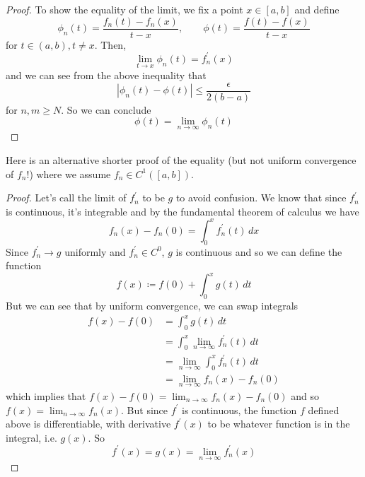 \begin{proof}
    To show the equality of the limit, we fix a point $x \in [a, b]$ and define 
    \begin{equation}
      \phi_n (t) = \frac{f_n (t) - f_n (x)}{t - x}, \qquad \phi(t) = \frac{f(t) - f(x)}{t - x} 
    \end{equation}
    for $t \in (a, b), t \neq x$. Then, 
    \begin{equation}
      \lim_{t \to x} \phi_n (t) = f_n^\prime (x) 
    \end{equation}
    and we can see from the above inequality that 
    \begin{equation}
      | \phi_n (t) - \phi(t) | \leq \frac{\epsilon}{2 (b - a)}
    \end{equation}
    for $n, m \geq N$. So we can conclude 
    \begin{equation}
      \phi(t) = \lim_{n \to \infty} \phi_n (t)
    \end{equation}
  \end{proof}

  Here is an alternative shorter proof of the equality (but not uniform convergence of $f_n$!) where we assume $f_n \in C^1([a, b])$. 

  \begin{proof}
    Let's call the limit of $f^\prime_n$ to be $g$ to avoid confusion. We know that since $f_n^\prime$ is continuous, it's integrable and by the fundamental theorem of calculus we have 
    \begin{equation}
      f_n (x) - f_n (0) = \int_0^x f_n^\prime (t) \,dx 
    \end{equation}
    Since $f_n^\prime \to g$ uniformly and $f_n^\prime \in C^0$, $g$ is continuous and so we can define the function
    \begin{equation}
      f(x) \coloneqq f(0) + \int_0^x g(t) \,dt
    \end{equation}
    But we can see that by uniform convergence, we can swap integrals  
    \begin{align}
      f(x) - f(0) & = \int_0^x g(t) \,dt \\ 
                  & = \int_0^x \lim_{n \to \infty} f_n^\prime (t) \,dt \\
                  & = \lim_{n \to \infty} \int_0^x f_n^\prime (t) \,dt \\ 
                  & = \lim_{n \to \infty} f_n (x) - f_n (0) 
    \end{align}
    which implies that $f(x) - f(0) = \lim_{n \to \infty} f_n (x) - f_n (0)$ and so $f(x) = \lim_{n \to \infty} f_n (x)$. But since $f^\prime$ is continuous, the function $f$ defined above is differentiable, with derivative $f^\prime (x)$ to be whatever function is in the integral, i.e. $g(x)$. So
    \begin{equation}
      f^\prime (x) = g(x) = \lim_{n \to \infty} f_n^\prime (x)
    \end{equation}
  \end{proof}

